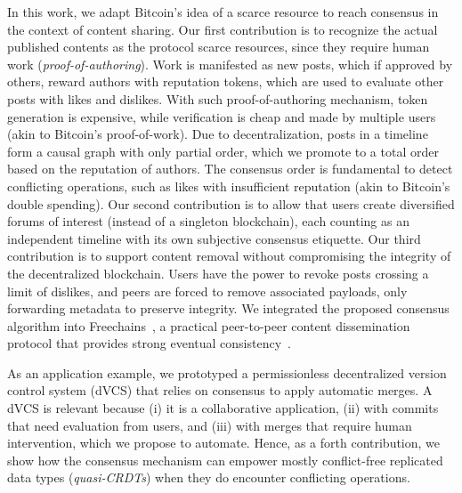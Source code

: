 \documentclass[10pt,journal,compsoc]{IEEEtran}
\newcommand{\FC}       {Freechains\xspace}
\newcommand{\reps}     {\emph{reps}\xspace}
\begin{document}
In this work, we adapt Bitcoin's idea of a scarce resource to reach consensus
in the context of content sharing.
%
Our first contribution is to recognize the actual published contents as the
protocol scarce resources, since they require human work
(\emph{proof-of-authoring}).
%
Work is manifested as new posts, which if approved by others, reward authors
with reputation tokens, which are used to evaluate other posts with likes and
dislikes.
With such proof-of-authoring mechanism, token generation is expensive, while
verification is cheap and made by multiple users (akin to Bitcoin's
proof-of-work).
%
Due to decentralization, posts in a timeline form a causal graph with only
partial order, which we promote to a total order based on the reputation of
authors.
The consensus order is fundamental to detect conflicting operations, such as
likes with insufficient reputation (akin to Bitcoin's double spending).
%
Our second contribution is to allow that users create diversified forums of
interest (instead of a singleton blockchain), each counting as an independent
timeline with its own subjective consensus etiquette.
%
Our third contribution is to support content removal without compromising the
integrity of the decentralized blockchain.
Users have the power to revoke posts crossing a limit of dislikes, and peers
are forced to remove associated payloads, only forwarding metadata to preserve
integrity.
%
We integrated the proposed consensus algorithm into \FC~\cite{fcs.sbseg20}, a
practical peer-to-peer content dissemination protocol that provides strong
eventual consistency~\cite{p2p.crdts,p2p.sec}.

As an application example, we prototyped a permissionless decentralized version
control system (dVCS) that relies on consensus to apply automatic merges.
A dVCS is relevant because
    (i)   it is a collaborative application,
    (ii)  with commits that need evaluation from users, and
    (iii) with merges that require human intervention, which we propose to
          automate.
%
Hence, as a forth contribution, we show how the consensus mechanism can empower
mostly conflict-free replicated data types (\emph{quasi-CRDTs}) when they do
encounter conflicting operations.
\end{document}
